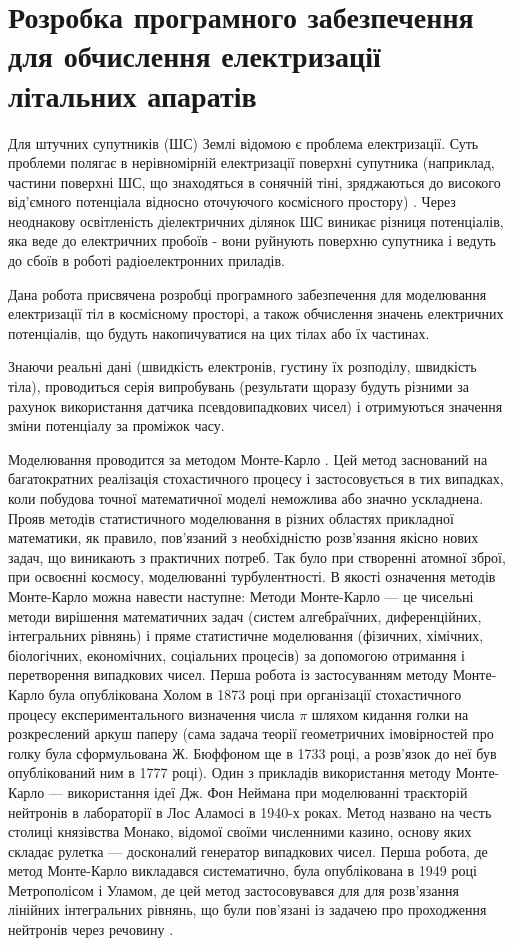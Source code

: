 \documentclass[a4paper,12pt]{article}
\begin{document}
\section{Розробка програмного забезпечення для обчислення електризації літальних апаратів}
Для штучних супутників (ШС) Землі відомою є проблема електризації. Суть проблеми полягає в нерівномірній електризації поверхні супутника (наприклад, частини поверхні ШС, що знаходяться в сонячній тіні, зряджаються до високого від’ємного потенціала відносно оточуючого космісного простору) \cite{report1}. Через неоднакову освітленість діелектричних ділянок ШС виникає різниця потенціалів, яка веде до електричних пробоїв - вони руйнують поверхню супутника і ведуть до сбоїв в роботі радіоелектронних приладів.

Дана робота присвячена розробці програмного забезпечення для моделювання електризації тіл в космісному просторі, а також обчислення значень електричних потенціалів, що будуть накопичуватися на цих тілах або їх частинах.

Знаючи реальні дані (швидкість електронів, густину їх розподілу, швидкість тіла), проводиться серія випробувань (результати щоразу будуть різними за рахунок використання датчика псевдовипадкових чисел) і отримуються значення зміни потенціалу за проміжок часу.

Моделювання проводится за методом Монте-Карло \cite{report2}. Цей метод заснований на багатократних реалізація стохастичного процесу і застосовується в тих випадках, коли побудова точної математичної моделі неможлива або значно ускладнена. Прояв методів статистичного моделювання в різних областях прикладної математики, як правило, пов’язаний з необхідністю розв’язання якісно нових задач, що виникають з практичних потреб. Так було при створенні атомної зброї, при освоєнні космосу, моделюванні турбулентності. В якості означення методів Монте-Карло можна навести наступне:
Методи Монте-Карло — це чисельні методи вирішення математичних задач (систем алгебраїчних, диференційних, інтегральних рівнянь) і пряме статистичне моделювання (фізичних, хімічних, біологічних, економічних, соціальних процесів) за допомогою отримання і перетворення випадкових чисел. Перша робота із застосуванням методу Монте-Карло була опублікована Холом в 1873 році при організації стохастичного процесу експериментального визначення числа $\pi$ шляхом кидання голки на розкреслений аркуш паперу (сама задача теорії геометричних імовірностей про голку була сформульована Ж. Бюффоном ще в 1733 році, а розв’язок до неї був опублікований ним в 1777 році). Один з прикладів використання методу Монте-Карло — використання ідеї Дж. Фон Неймана при моделюванні траєкторій нейтронів в лабораторії в Лос Аламосі в 1940-х роках. Метод названо на честь столиці князівства Монако, відомої своїми численними  казино, основу яких складає рулетка — досконалий генератор випадкових чисел. Перша робота, де метод Монте-Карло викладався систематично, була опублікована в 1949 році Метрополісом і Уламом, де цей метод застосовувався для для розв’язання лінійних інтегральних рівнянь, що були пов’язані із задачею про проходження нейтронів через речовину \cite{report3}.
\end{document}
